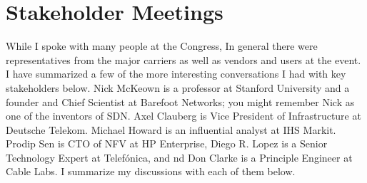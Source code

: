 \documentclass[11pt, oneside]{article}   	%
\begin{document}
\section{Stakeholder Meetings} 
\label{sec:stakeholders}
While I spoke with many people at the Congress, In general there were representatives from the major carriers as well as vendors and users at the event. I have summarized a few of the more interesting conversations I had with key stakeholders below. Nick McKeown is a professor at Stanford University and a founder and Chief Scientist at Barefoot Networks; you might remember Nick as one of the inventors of SDN. Axel  Clauberg is Vice President of Infrastructure at Deutsche Telekom. Michael Howard is an influential analyst at IHS Markit. Prodip Sen is CTO of NFV at HP Enterprise, Diego R. Lopez is a Senior Technology Expert at Telef\'onica, and nd Don Clarke is a Principle Engineer at Cable Labs. I summarize my discussions with each of them below.
\end{document}
